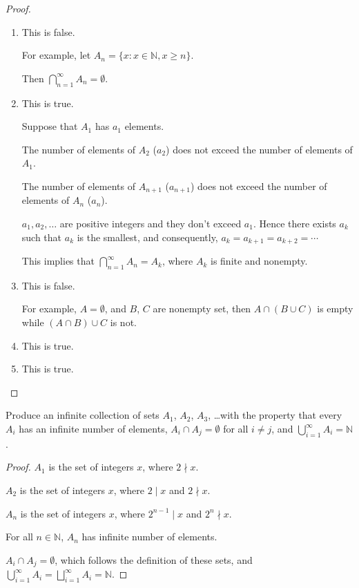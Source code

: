 \documentclass[class=understanding-analysis,crop=false]{standalone}
\begin{document}
\begin{proof}
    \begin{enumerate}[label = (\alph*)]
        \item This is false.
            \par For example, let $A_{n} = \{ x : x\in\mathbb{N}, x\ge n \}$.
            \par Then $\bigcap^{\infty}_{n=1}A_{n} = \emptyset$.
        \item This is true.
            \par Suppose that $A_{1}$ has $a_{1}$ elements.
            \par The number of elements of $A_{2}$ ($a_{2}$) does not exceed the number of elements of $A_{1}$.
            \par The number of elements of $A_{n+1}$ ($a_{n+1}$) does not exceed the number of elements of $A_{n}$ ($a_{n}$).
            \par $a_{1}, a_{2}, \ldots$ are positive integers and they don't exceed $a_{1}$. Hence there exists $a_{k}$ such that $a_{k}$ is the smallest, and consequently, $a_{k} = a_{k+1} = a_{k+2} = \cdots$
            \par This implies that $\bigcap^{\infty}_{n=1}A_{n} = A_{k}$, where $A_{k}$ is finite and nonempty.
        \item This is false.
            \par For example, $A = \emptyset$, and $B$, $C$ are nonempty set, then $A\cap (B\cup C)$ is empty while $(A\cap B)\cup C$ is not.
        \item This is true.
        \item This is true.
    \end{enumerate}
\end{proof}

\begin{exercise}
    \par Produce an infinite collection of sets $A_{1}$, $A_{2}$, $A_{3}$, \ldots with the property that every $A_{i}$ has an infinite number of elements, $A_{i}\cap A_{j} = \emptyset$ for all $i\ne j$, and $\bigcup^{\infty}_{i=1}A_{i} = \mathbb{N}$.
\end{exercise}

\begin{proof}
    \par $A_{1}$ is the set of integers $x$, where $2 \nmid x$.
    \par $A_{2}$ is the set of integers $x$, where $2 \mid x$ and $2 \nmid x$.
    \par $A_{n}$ is the set of integers $x$, where $2^{n-1} \mid x$ and $2^{n} \nmid x$.
    \par For all $n\in\mathbb{N}$, $A_{n}$ has infinite number of elements.
    \par $A_{i}\cap A_{j} = \emptyset$, which follows the definition of these sets, and $\bigcup^{\infty}_{i=1}A_{i} = \bigsqcup^{\infty}_{i=1}A_{i} = \mathbb{N}$.
\end{proof}
\end{document}
